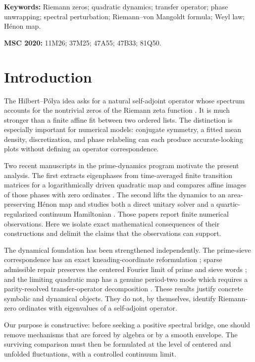 \documentclass[11pt]{article}
\theoremstyle{definition}
\theoremstyle{remark}
\begin{document}
\noindent\textbf{Keywords:} Riemann zeros; quadratic dynamics; transfer operator; phase unwrapping; spectral perturbation; Riemann--von Mangoldt formula; Weyl law; H\'{e}non map.

\medskip
\noindent\textbf{MSC 2020:} 11M26; 37M25; 47A55; 47B33; 81Q50.

\section{Introduction}

The Hilbert--P\'{o}lya idea asks for a natural self-adjoint operator whose spectrum accounts for the nontrivial zeros of the Riemann zeta function \citep{BerryKeating1999,SchumayerHutchinson2011}.  It is much stronger than a finite affine fit between two ordered lists.  The distinction is especially important for numerical models: conjugate symmetry, a fitted mean density, discretization, and phase relabeling can each produce accurate-looking plots without defining an operator correspondence.

Two recent manuscripts in the prime-dynamics program motivate the present analysis.  The first extracts eigenphases from time-averaged finite transition matrices for a logarithmically driven quadratic map and compares affine images of those phases with zero ordinates \citep{WangSpectralFlow2026}.  The second lifts the dynamics to an area-preserving H\'{e}non map and studies both a direct unitary solver and a quartic-regularized continuum Hamiltonian \citep{WangHenon2026}.  Those papers report finite numerical observations.  Here we isolate exact mathematical consequences of their constructions and delimit the claims that the observations can support.

The dynamical foundation has been strengthened independently.  The prime-sieve correspondence has an exact kneading-coordinate reformulation \citep{WangReformulation2026}; sparse admissible repair preserves the centered Fourier limit of prime and sieve words \citep{WangPrimeSpectrum2026}; and the limiting quadratic map has a genuine period-two mode which requires a parity-resolved transfer-operator decomposition \citep{WangParity2026}.  These results justify concrete symbolic and dynamical objects.  They do not, by themselves, identify Riemann-zero ordinates with eigenvalues of a self-adjoint operator.

Our purpose is constructive: before seeking a positive spectral bridge, one should remove mechanisms that are forced by algebra or by a smooth envelope.  The surviving comparison must then be formulated at the level of centered and unfolded fluctuations, with a controlled continuum limit.
\end{document}
